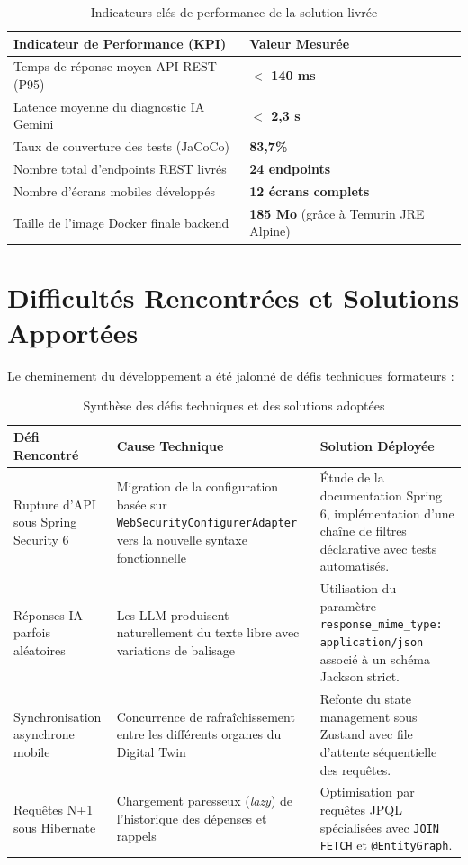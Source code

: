 \documentclass[12pt,a4paper,oneside]{report}
\begin{document}
\begin{table}[H]
\centering
\small
\begin{tabularx}{\textwidth}{p{5cm} X}
\toprule
\textbf{Indicateur de Performance (KPI)} & \textbf{Valeur Mesur\'ee} \\
\midrule
Temps de r\'eponse moyen API REST (P95) & \textbf{$<$ 140 ms} \\
Latence moyenne du diagnostic IA Gemini & \textbf{$<$ 2,3 s} \\
Taux de couverture des tests (JaCoCo) & \textbf{83,7\%} \\
Nombre total d'endpoints REST livr\'es & \textbf{24 endpoints} \\
Nombre d'\'ecrans mobiles d\'evelopp\'es & \textbf{12 \'ecrans complets} \\
Taille de l'image Docker finale backend & \textbf{185 Mo} (gr\^ace \`a Temurin JRE Alpine) \\
\bottomrule
\end{tabularx}
\caption{Indicateurs cl\'es de performance de la solution livr\'ee}
\label{tab:kpi_ch6}
\end{table}

\section{Difficult\'es Rencontr\'ees et Solutions Apport\'ees}
Le cheminement du d\'eveloppement a \'et\'e jalonn\'e de d\'efis techniques formateurs :

\begin{table}[H]
\centering
\small
\begin{tabularx}{\textwidth}{p{3.5cm} X X}
\toprule
\textbf{D\'efi Rencontr\'e} & \textbf{Cause Technique} & \textbf{Solution D\'eploy\'ee} \\
\midrule
Rupture d'API sous Spring Security 6 & Migration de la configuration bas\'ee sur \texttt{WebSecurityConfigurerAdapter} vers la nouvelle syntaxe fonctionnelle & \'Etude de la documentation Spring 6, impl\'ementation d'une cha\^ine de filtres d\'eclarative avec tests automatis\'es. \\
\addlinespace
R\'eponses IA parfois al\'eatoires & Les LLM produisent naturellement du texte libre avec variations de balisage & Utilisation du param\`etre \texttt{response\_mime\_type: application/json} associ\'e \`a un sch\'ema Jackson strict. \\
\addlinespace
Synchronisation asynchrone mobile & Concurrence de rafra\^ichissement entre les diff\'erents organes du Digital Twin & Refonte du state management sous Zustand avec file d'attente s\'equentielle des requ\^etes. \\
\addlinespace
Requ\^etes N+1 sous Hibernate & Chargement paresseux (\textit{lazy}) de l'historique des d\'epenses et rappels & Optimisation par requ\^etes JPQL sp\'ecialis\'ees avec \texttt{JOIN FETCH} et \texttt{@EntityGraph}. \\
\bottomrule
\end{tabularx}
\caption{Synth\`ese des d\'efis techniques et des solutions adopt\'ees}
\label{tab:defis_ch6}
\end{table}
\end{document}
